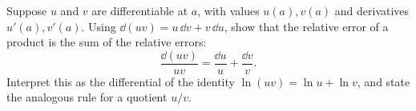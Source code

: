 \begin{exercise}
Suppose $u$ and $v$ are differentiable at $a$, with values $u(a), v(a)$ and
derivatives $u'(a), v'(a)$. Using $\dd(uv) = u\,\dd v + v\,\dd u$, show that the
relative error of a product is the sum of the relative errors:
\[
\frac{\dd(uv)}{uv} = \frac{\dd u}{u} + \frac{\dd v}{v}.
\]
Interpret this as the differential of the identity $\ln(uv) = \ln u + \ln v$, and
state the analogous rule for a quotient $u/v$.
\end{exercise}
